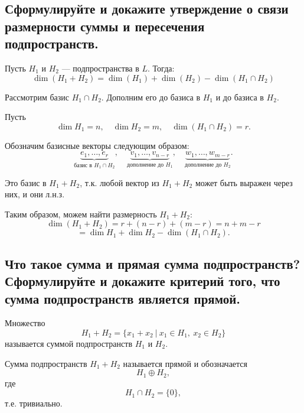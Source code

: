 \subsection{Сформулируйте и докажите утверждение о связи размерности суммы и пересечения подпространств.}
\begin{theorem}
    Пусть $H_1$ и $H_2$ --- подпространства в $L$. Тогда:
    \[
        \dim(H_1 + H_2)
        =
        \dim(H_1) + \dim(H_2) - \dim(H_1 \cap H_2)
    \]
\end{theorem}

\begin{Proof}
    Рассмотрим базис $H_1 \cap H_2$. Дополним его до базиса в $H_1$ и до базиса в $H_2$.
    
    Пусть
    \[
        \dim H_1 = n,\quad \dim H_2 = m,\quad \dim(H_1 \cap H_2) = r.
    \]
    
    Обозначим базисные векторы следующим образом:
    \[
        \underbrace{e_1,\ldots,e_r}_{\text{базис в } H_1 \cap H_2},
        \quad
        \underbrace{v_1,\ldots,v_{n-r}}_{\text{дополнение до } H_1},
        \quad
        \underbrace{w_1,\ldots,w_{m-r}}_{\text{дополнение до } H_2}.
    \]
    
    Это базис в $H_1 + H_2$, т.к. любой вектор из $H_1 + H_2$ может быть выражен через них, и они л.н.з.
    
    Таким образом, можем найти размерность $H_1 + H_2$:
    \[
        \dim(H_1 + H_2)
        =
        r + (n-r) + (m-r)
        =
        n + m - r
    \]
    \[
        =
        \dim H_1 + \dim H_2 - \dim(H_1 \cap H_2).
    \]
\end{Proof}
\subsection{Что такое сумма и прямая сумма подпространств? Сформулируйте и докажите критерий того, что сумма подпространств является прямой.}
\begin{definition}
    Множество
    \[
        H_1 + H_2 =
        \{x_1 + x_2\ |\ x_1 \in H_1,\ x_2 \in H_2\}
    \]
    называется суммой подпространств $H_1$ и $H_2$.
\end{definition}

\begin{definition}
    Сумма подпространств $H_1 + H_2$ называется прямой и обозначается
    \[
        H_1 \oplus H_2,
    \]
    где
    \[
        H_1 \cap H_2 = \{0\},
    \]
    т.е. тривиально.
\end{definition}

